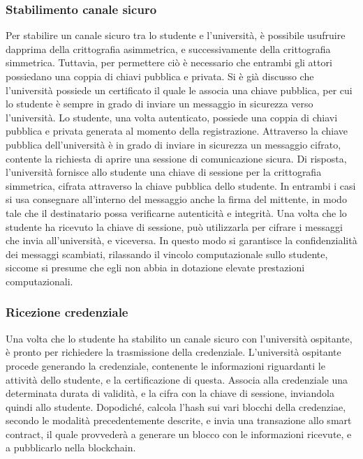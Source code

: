 \documentclass[a4paper,12pt]{article}
\begin{document}
\subsubsection{Stabilimento canale sicuro}
Per stabilire un canale sicuro tra lo studente e l'università, è possibile usufruire dapprima della crittografia asimmetrica, e successivamente della crittografia simmetrica. Tuttavia, per permettere ciò è necessario che entrambi gli attori possiedano una coppia di chiavi pubblica e privata. Si è già discusso che l'università possiede un certificato il quale le associa una chiave pubblica, per cui lo studente è sempre in grado di inviare un messaggio in sicurezza verso l'università.
\newline Lo studente, una volta autenticato, possiede una coppia di chiavi pubblica e privata generata al momento della registrazione. Attraverso la chiave pubblica dell'università è in grado di inviare in sicurezza un messaggio cifrato, contente la richiesta di aprire una sessione di comunicazione sicura. Di risposta, l'università fornisce allo studente una chiave di sessione per la crittografia simmetrica, cifrata attraverso la chiave pubblica dello studente. In entrambi i casi si usa consegnare all'interno del messaggio anche la firma del mittente, in modo tale che il destinatario possa verificarne autenticità e integrità.
\newline Una volta che lo studente ha ricevuto la chiave di sessione, può utilizzarla per cifrare i messaggi che invia all'università, e viceversa. In questo modo si garantisce la confidenzialità dei messaggi scambiati, rilassando il vincolo computazionale sullo studente, siccome si presume che egli non abbia in dotazione elevate prestazioni computazionali.
\subsubsection{Ricezione credenziale}
Una volta che lo studente ha stabilito un canale sicuro con l'università ospitante, è pronto per richiedere la trasmissione della credenziale. L'università ospitante procede generando la credenziale, contenente le informazioni riguardanti le attività dello studente, e la certificazione di questa. Associa alla credenziale una determinata durata di validità, e la cifra con la chiave di sessione, inviandola quindi allo studente. Dopodiché, calcola l'hash sui vari blocchi della credenziae, secondo le modalità precedentemente descrite, e invia una transazione allo smart contract, il quale provvederà a generare un blocco con le informazioni ricevute, e a pubblicarlo nella blockchain.
\end{document}
